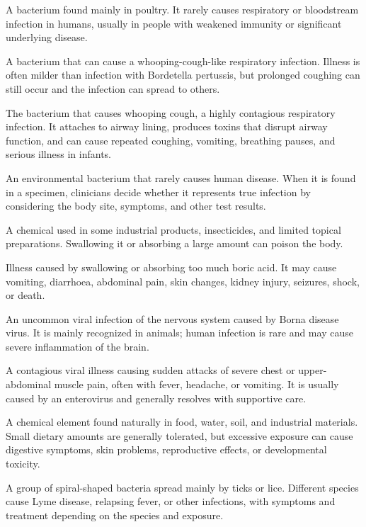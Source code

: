  A bacterium found mainly in poultry. It rarely causes respiratory or bloodstream infection in humans, usually in people with weakened immunity or significant underlying disease.

 A bacterium that can cause a whooping-cough-like respiratory infection. Illness is often milder than infection with Bordetella pertussis, but prolonged coughing can still occur and the infection can spread to others.

 The bacterium that causes whooping cough, a highly contagious respiratory infection. It attaches to airway lining, produces toxins that disrupt airway function, and can cause repeated coughing, vomiting, breathing pauses, and serious illness in infants.

 An environmental bacterium that rarely causes human disease. When it is found in a specimen, clinicians decide whether it represents true infection by considering the body site, symptoms, and other test results.

 A chemical used in some industrial products, insecticides, and limited topical preparations. Swallowing it or absorbing a large amount can poison the body.

 Illness caused by swallowing or absorbing too much boric acid. It may cause vomiting, diarrhoea, abdominal pain, skin changes, kidney injury, seizures, shock, or death.

 An uncommon viral infection of the nervous system caused by Borna disease virus. It is mainly recognized in animals; human infection is rare and may cause severe inflammation of the brain.

 A contagious viral illness causing sudden attacks of severe chest or upper-abdominal muscle pain, often with fever, headache, or vomiting. It is usually caused by an enterovirus and generally resolves with supportive care.

 A chemical element found naturally in food, water, soil, and industrial materials. Small dietary amounts are generally tolerated, but excessive exposure can cause digestive symptoms, skin problems, reproductive effects, or developmental toxicity.

 A group of spiral-shaped bacteria spread mainly by ticks or lice. Different species cause Lyme disease, relapsing fever, or other infections, with symptoms and treatment depending on the species and exposure.

